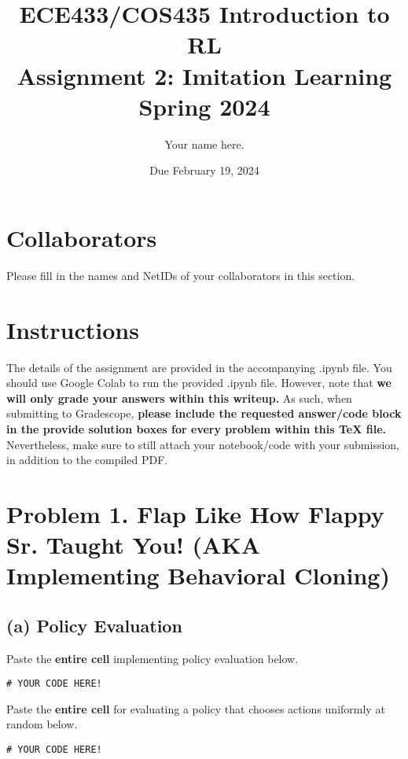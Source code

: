 \documentclass[12pt]{article}
\date{Due February 19, 2024}
\author{\begin{fillme}[width=0.3\textwidth]
 Your name here.
\end{fillme}} %
\title{ECE433/COS435 Introduction to RL\\
  Assignment 2: Imitation Learning\\
  Spring 2024\\
}
\begin{document}
    \maketitle
    \section*{Collaborators}
    \begin{fillme}
     Please fill in the names and NetIDs of your collaborators in this section.
    \end{fillme}

    \section*{Instructions}
    
    The details of the assignment are provided in the accompanying .ipynb file.
    You should use Google Colab to run the provided .ipynb file.
    However, note that \textbf{we will only grade your answers within this writeup.}
    As such, when submitting to Gradescope, \textbf{please include the requested answer/code block in the provide solution boxes for every problem within this TeX file.}
    Nevertheless, make sure to still attach your notebook/code with your submission, in addition to the compiled PDF.

    \clearpage
    
    \section*{Problem 1. Flap Like How Flappy Sr. Taught You! (AKA Implementing Behavioral Cloning)}
        \subsection*{(a) Policy Evaluation} 
            Paste the \textbf{entire cell} implementing policy evaluation below.
            \begin{solution}
                \begin{verbatim}
# YOUR CODE HERE!
                \end{verbatim}
            \end{solution}

            \noindent
            Paste the \textbf{entire cell} for evaluating a policy that chooses actions uniformly at random below.
            \begin{solution}
                \begin{verbatim}
# YOUR CODE HERE!
                \end{verbatim}
            \end{solution}
\end{document}
